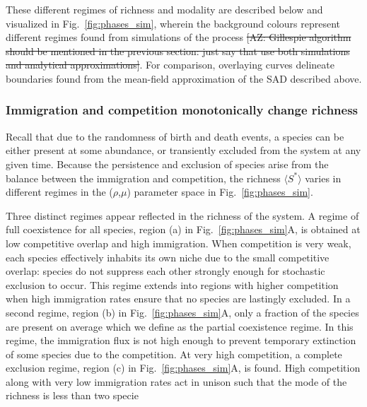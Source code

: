 \documentclass[9pt,twocolumn,twoside,lineno]{pnas-new}
\begin{document}
These different regimes of richness and modality are described below and visualized in Fig.~\ref{fig:phases_sim}, wherein the background colours represent different regimes found from simulations of the process \st{[AZ: Gillespie algorithm should be mentioned in the previous section: just say that use both simulations and analytical approximations]}.
For comparison, overlaying curves delineate boundaries found from the mean-field approximation of the SAD described above.

\subsubsection{Immigration and competition monotonically change richness}
%
Recall that due to the randomness of birth and death events, a species can be either present at some abundance, or transiently excluded from the system at any given time. %
Because the persistence and exclusion of species arise from the balance between the immigration and competition, the richness {$\langle S^* \rangle$} varies in different regimes in the ($\rho$,$\mu$) parameter space in Fig.~\ref{fig:phases_sim}.

Three distinct regimes appear reflected in the richness of the system. 
A regime of full coexistence for all species, region (a) in Fig.~\ref{fig:phases_sim}A, is obtained at low competitive overlap and high immigration. 
When competition is very weak, each species effectively inhabits its own niche due to the small competitive overlap: species do not suppress each other strongly enough for stochastic exclusion to occur.
This regime extends into regions with higher competition when high immigration rates ensure that no species are lastingly excluded.
In a second regime, region (b) in Fig.~\ref{fig:phases_sim}A, only a fraction of the species are present on average which we define as the partial coexistence regime. 
In this regime, the immigration flux is not high enough to prevent temporary extinction of some species due to the competition. %
At very high competition, a complete exclusion regime, region (c) in Fig.~\ref{fig:phases_sim}A, is found. 
High competition along with very low immigration rates act in unison such that the mode of the richness is less than two specie
\end{document}
